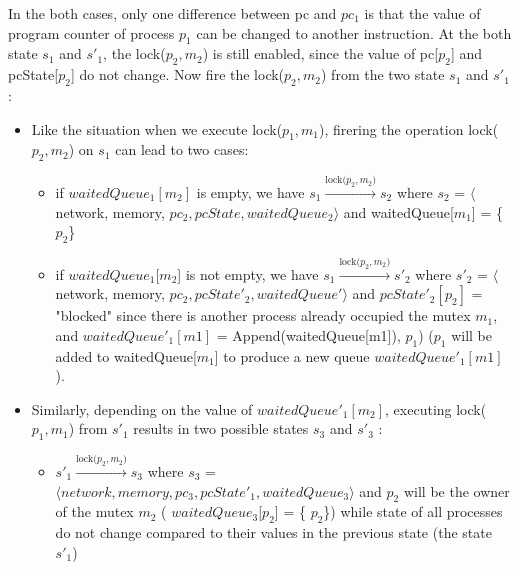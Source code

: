 \documentclass[a4paper,11pt]{article}
\begin{document}
\begin{appendices}
  In the both cases, only one difference between pc and $pc_1$ is that the value of program counter of process $p_1$ can be changed to another instruction. At the both state $s_1$ and $s'_1$, the lock($p_2, m_2$) is still enabled, since the value of pc[$p_2$] and pcState[$p_2$] do not change. Now fire the lock($p_2, m_2$) from the two state $s_1$ and $s'_1$:
  \begin{itemize}
  	\item Like the situation when we execute lock($p_1, m_1$), firering the operation lock($p_2, m_2$) on $s_1$ can lead to two cases:
	  	\begin{itemize}
			\item  if $waitedQueue_1[m_2]$ is empty, we have $s_1\xrightarrow{\text{lock($p_2, m_2$)}}s_2$ where  $s_2$ = $\langle$ network, memory, $pc_2, pcState, waitedQueue_2 \rangle$ and waitedQueue[$m_1$] = \{$p_2$\}
			\item if $waitedQueue_1[m_2$] is not empty, we have $s_1\xrightarrow{\text{lock($p_2, m_2$)}}s'_2$ where  $s'_2$ = $\langle$ network, memory, $pc_2, pcState'_2, waitedQueue' \rangle$ and $pcState'_2[p_2]$ = "blocked" since there is another process already occupied the mutex $m_1$, and  $waitedQueue'_1[m1]$ = Append(waitedQueue[m1]), $p_1$) ($p_1$ will be added to waitedQueue[$m_1$] to produce a new queue $waitedQueue'_1[m1]$). 
	  	\end{itemize}
	\item Similarly, depending on the value  of $waitedQueue'_1[m_2]$, executing lock($p_1, m_1$) from $s'_1$ results in two possible states $s_3$ and $s'_3$ :
	
  	  \begin{itemize}
  	  	\item  $s'_1\xrightarrow{\text{lock($p_2, m_2$)}}s_3$ where $s_3$ = $\langle network, memory, pc_3, pcState'_1, waitedQueue_3 \rangle$ and $p_2$ will be the owner of the mutex $m_2$ ( $waitedQueue_3$[$p_2$] = \{ $p_2$\}) while state of all processes do not change compared to their values in the previous state (the state $s'_1$)
  	  	  	  	  	

\end{itemize}
\end{itemize}
\end{appendices}
\end{document}
